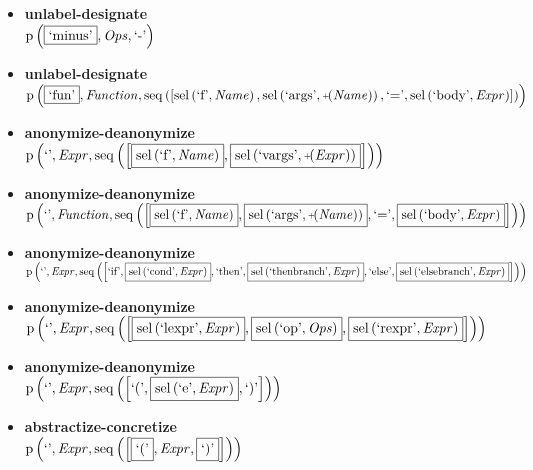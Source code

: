 {\begin{itemize}
\item \textbf{unlabel-designate}\\$\mathrm{p}\left(\fbox{\text{`minus'}},\mathit{Ops},\text{`-'}\right)$
\item \textbf{unlabel-designate}\\$\mathrm{p}\left(\fbox{\text{`fun'}},\mathit{Function},\mathrm{seq}\left(\left[\mathrm{sel}\left(\text{`f'},\mathit{Name}\right), \mathrm{sel}\left(\text{`args'},\plus \left(\mathit{Name}\right)\right), \text{`='}, \mathrm{sel}\left(\text{`body'},\mathit{Expr}\right)\right]\right)\right)$
\item \textbf{anonymize-deanonymize}\\$\mathrm{p}\left(\text{`'},\mathit{Expr},\mathrm{seq}\left(\left[\fbox{$\mathrm{sel}\left(\text{`f'},\mathit{Name}\right)$}, \fbox{$\mathrm{sel}\left(\text{`vargs'},\plus \left(\mathit{Expr}\right)\right)$}\right]\right)\right)$
\item \textbf{anonymize-deanonymize}\\$\mathrm{p}\left(\text{`'},\mathit{Function},\mathrm{seq}\left(\left[\fbox{$\mathrm{sel}\left(\text{`f'},\mathit{Name}\right)$}, \fbox{$\mathrm{sel}\left(\text{`args'},\plus \left(\mathit{Name}\right)\right)$}, \text{`='}, \fbox{$\mathrm{sel}\left(\text{`body'},\mathit{Expr}\right)$}\right]\right)\right)$
\item \textbf{anonymize-deanonymize}\\$\mathrm{p}\left(\text{`'},\mathit{Expr},\mathrm{seq}\left(\left[\text{`if'}, \fbox{$\mathrm{sel}\left(\text{`cond'},\mathit{Expr}\right)$}, \text{`then'}, \fbox{$\mathrm{sel}\left(\text{`thenbranch'},\mathit{Expr}\right)$}, \text{`else'}, \fbox{$\mathrm{sel}\left(\text{`elsebranch'},\mathit{Expr}\right)$}\right]\right)\right)$
\item \textbf{anonymize-deanonymize}\\$\mathrm{p}\left(\text{`'},\mathit{Expr},\mathrm{seq}\left(\left[\fbox{$\mathrm{sel}\left(\text{`lexpr'},\mathit{Expr}\right)$}, \fbox{$\mathrm{sel}\left(\text{`op'},\mathit{Ops}\right)$}, \fbox{$\mathrm{sel}\left(\text{`rexpr'},\mathit{Expr}\right)$}\right]\right)\right)$
\item \textbf{anonymize-deanonymize}\\$\mathrm{p}\left(\text{`'},\mathit{Expr},\mathrm{seq}\left(\left[\text{`('}, \fbox{$\mathrm{sel}\left(\text{`e'},\mathit{Expr}\right)$}, \text{`)'}\right]\right)\right)$
\item \textbf{abstractize-concretize}\\$\mathrm{p}\left(\text{`'},\mathit{Expr},\mathrm{seq}\left(\left[\fbox{$\text{`('}$}, \mathit{Expr}, \fbox{$\text{`)'}$}\right]\right)\right)$

\end{itemize}}
